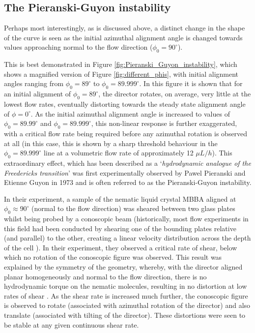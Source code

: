 \subsection{The Pieranski-Guyon instability}
\label{pg_instability}
Perhaps most interestingly, as is discussed above, a distinct change in the shape of the curve is seen as the initial azimuthal alignment angle is changed towards values approaching normal to the flow direction ($\phi_0=90^{\circ}$).

This is best demonstrated in Figure \ref{fig:Pieranski_Guyon_instability}, which shows a magnified version of Figure \ref{fig:different_phis}, with initial alignment angles ranging from $\phi_0=89^{\circ}$ to $\phi_0=89.999^{\circ}$. In this figure it is shown that for an initial alignment of $\phi_0=89^{\circ}$, the director rotates, on average, very little at the lowest flow rates, eventually distorting towards the steady state alignment angle of $\phi=0^{\circ}$. As the initial azimuthal alignment angle is increased to values of $\phi_0=89.99^{\circ}$ and $\phi_0=89.999^{\circ}$, this non-linear response is further exaggerated, with a critical flow rate being required before any azimuthal rotation is observed at all (in this case, this is shown by a sharp threshold behaviour in the $\phi_0=89.999^{\circ}$ line at a volumetric flow rate of approximately 12 $\mu L/h$). This extraordinary effect, which has been described as a `\textit{hydrodynamic analogue of the Freedericks transition}' was first experimentally observed by Pawel Pieranski and Etienne Guyon in 1973 \cite{Pieranski1973} and is often referred to as the Pieranski-Guyon instability.

In their experiment, a sample of the nematic liquid crystal MBBA aligned at $\phi_0\approx90^{\circ}$ (normal to the flow direction) was sheared between two glass plates whilst being probed by a conoscopic beam (historically, most flow experiments in this field had been conducted by shearing one of the bounding plates relative (and parallel) to the other, creating a linear velocity distribution across the depth of the cell \citep{Boudreau1999,Horn2003,VanHorn2000,Graf1992,Borzsonyi1998,Kemp1971}). In their experiment, they observed a critical rate of shear, below which no rotation of the conoscopic figure was observed. This result was explained by the symmetry of the geometry, whereby, with the director aligned planar homogeneously and normal to the flow direction, there is no hydrodynamic torque on the nematic molecules, resulting in no distortion at low rates of shear \cite{Pieranski1973}. As the shear rate is increased much further, the conoscopic figure is observed to rotate (associated with azimuthal rotation of the director) and also translate (associated with tilting of the director). These distortions were seen to be stable at any given continuous shear rate.

